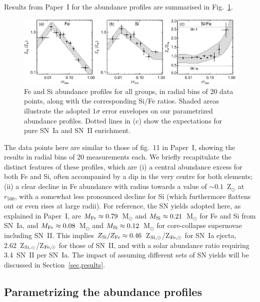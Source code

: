 \documentclass[useAMS,usenatbib]{mn2e}
\begin{document}
Results from Paper~I for the abundance profiles are summarised in
Fig.~\ref{fig,norm_bin}.
\begin{figure} 
 \includegraphics[width=176mm]{fig1.eps} 
 \caption{Fe and Si abundance profiles for all groups, in radial bins
   of 20 data points, along with the corresponding Si/Fe
   ratios. Shaded areas illustrate the adopted $1\sigma$ error
   envelopes on our parametrized abundance profiles. Dotted lines in
   (c) show the expectations for pure SN~Ia and SN~II enrichment.}
\label{fig,norm_bin} 
\end{figure} 
The data points here are similar to those of fig.~11 in Paper~I,
showing the results in radial bins of 20 measurements each. We briefly
recapitulate the distinct features of these profiles, which are (i) a
central abundance excess for both Fe and Si, often accompanied by a
dip in the very centre for both elements; (ii) a clear decline in Fe
abundance with radius towards a value of $\sim 0.1$~Z$_\odot$ at
$r_{500}$, with a somewhat less pronounced decline for Si (which
furthermore flattens out or even rises at large radii). For reference,
the SN yields adopted here, as explained in Paper~I, are $M_{\rm
Fe}\approx 0.79$~M$_\odot$ and $M_{\rm Si}\approx 0.21$~M$_\odot$ for
Fe and Si from SN~Ia, and $M_{\rm Fe}\approx 0.08$~M$_\odot$ and
$M_{\rm Si}\approx 0.12$~M$_\odot$ for core-collapse supernovae
including SN~II. This implies $Z_{\rm Si}/Z_{\rm Fe}\approx
0.46$~Z$_{\rm Si,\odot}$/Z$_{\rm Fe,\odot}$ for SN~Ia ejecta,
2.62~Z$_{\rm Si,\odot}$/Z$_{\rm Fe,\odot}$ for those of SN~II, and
with a solar abundance ratio requiring 3.4~SN~II per SN~Ia.  The
impact of assuming different sets of SN yields will be discussed in
Section~\ref{sec,results}.




 

\subsection{Parametrizing the abundance profiles}
\end{document}
